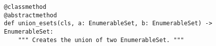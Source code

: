 \begin{verbatim}
@classmethod
@abstractmethod
def union_esets(cls, a: EnumerableSet, b: EnumerableSet) -> EnumerableSet:
    """ Creates the union of two EnumerableSet. """
\end{verbatim}